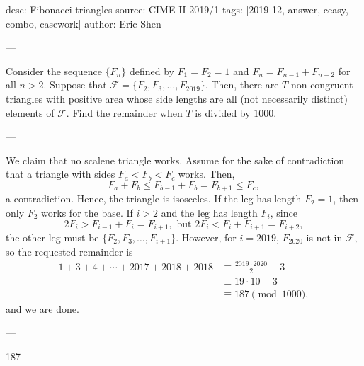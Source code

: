 desc: Fibonacci triangles
source: CIME II 2019/1
tags: [2019-12, answer, ceasy, combo, casework]
author: Eric Shen

---

Consider the sequence $\{F_n\}$ defined by $F_1=F_2=1$ and $F_n=F_{n-1}+F_{n-2}$ for all $n>2$. Suppose that $\mathcal{F}=\{F_2,F_3,\ldots,F_{2019}\}$. Then, there are $T$ non-congruent triangles with positive area whose side lengths are all (not necessarily distinct) elements of $\mathcal{F}$. Find the remainder when $T$ is divided by $1000$.

---

We claim that no scalene triangle works. Assume for the sake of contradiction that a triangle with sides $F_a<F_b<F_c$ works. Then, $$F_a+F_b\le F_{b-1}+F_b=F_{b+1}\le F_c,$$
a contradiction. Hence, the triangle is isosceles. If the leg has length $F_2=1$, then only $F_2$ works for the base. If $i>2$ and the leg has length $F_i$, since $$2F_i>F_{i-1}+F_i=F_{i+1},\text{ but }2F_i<F_i+F_{i+1}=F_{i+2},$$
the other leg must be $\{F_2,F_3,\ldots,F_{i+1}\}$. However, for $i=2019$, $F_{2020}$ is not in $\mathcal{F}$, so the requested remainder is
\begin{align*}
    1+3+4+\cdots+2017+2018+2018&\equiv\frac{2019\cdot 2020}2-3\\
    &\equiv 19\cdot 10-3\\
    &\equiv 187\pmod{1000},
\end{align*}
and we are done.

---

187

